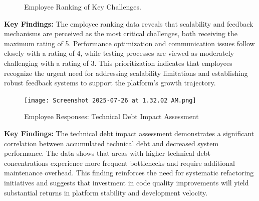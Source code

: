 \documentclass[12pt,a4paper,oneside]{book}
\begin{document}
\begin{figure}[h!]
    \centering
    \caption{Employee Ranking of Key Challenges.}
    \label{fig:employee_challenges}
\end{figure}

\textbf{Key Findings:} The employee ranking data reveals that scalability and feedback mechanisms are perceived as the most critical challenges, both receiving the maximum rating of 5. Performance optimization and communication issues follow closely with a rating of 4, while testing processes are viewed as moderately challenging with a rating of 3. This prioritization indicates that employees recognize the urgent need for addressing scalability limitations and establishing robust feedback systems to support the platform's growth trajectory.

\begin{figure}[H]
    \centering
    \texttt{[image: Screenshot 2025-07-26 at 1.32.02 AM.png]} %
    \caption{Employee Responses: Technical Debt Impact Assessment}
    \label{fig:technical_debt_impact}
\end{figure}

\textbf{Key Findings:} The technical debt impact assessment demonstrates a significant correlation between accumulated technical debt and decreased system performance. The data shows that areas with higher technical debt concentrations experience more frequent bottlenecks and require additional maintenance overhead. This finding reinforces the need for systematic refactoring initiatives and suggests that investment in code quality improvements will yield substantial returns in platform stability and development velocity.
\end{document}
